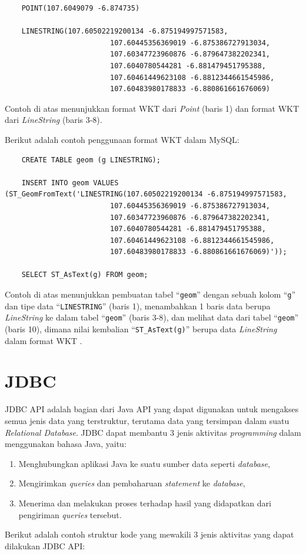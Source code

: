 \begin{lstlisting}
	POINT(107.6049079 -6.874735)
	
	LINESTRING(107.60502219200134 -6.875194997571583, 
						 107.60445356369019 -6.875386727913034,
						 107.60347723960876 -6.879647382202341,
						 107.6040780544281 -6.881479451795388,
						 107.60461449623108 -6.8812344661545986,
						 107.60483980178833 -6.880861661676069)
\end{lstlisting}

Contoh di atas menunjukkan format WKT dari \textit{Point} (baris 1) dan format WKT dari \textit{LineString} (baris 3-8).

Berikut adalah contoh penggunaan format WKT dalam MySQL:

\begin{lstlisting}
	CREATE TABLE geom (g LINESTRING);

	INSERT INTO geom VALUES (ST_GeomFromText('LINESTRING(107.60502219200134 -6.875194997571583, 
						 107.60445356369019 -6.875386727913034,
						 107.60347723960876 -6.879647382202341,
						 107.6040780544281 -6.881479451795388,
						 107.60461449623108 -6.8812344661545986,
						 107.60483980178833 -6.880861661676069)'));
	
	SELECT ST_AsText(g) FROM geom;
\end{lstlisting}

Contoh di atas menunjukkan pembuatan tabel ``\texttt{geom}'' dengan sebuah kolom ``\texttt{g}'' dan tipe data ``\texttt{LINESTRING}'' (baris 1), menambahkan 1 baris data berupa \textit{LineString} ke dalam tabel ``\texttt{geom}'' (baris 3-8), dan melihat data dari tabel ``\texttt{geom}'' (baris 10), dimana nilai kembalian ``\texttt{ST\_AsText(g)}'' berupa data \textit{LineString} dalam format WKT .



\section{JDBC}
\label{sec:jdbc}
JDBC API adalah bagian dari Java API yang dapat digunakan untuk mengakses semua jenis data yang terstruktur, terutama data yang tersimpan dalam suatu \textit{Relational Database}\cite{javadocumentation}. JDBC dapat membantu 3 jenis aktivitas \textit{programming} dalam menggunakan bahasa Java, yaitu:
\begin{enumerate}
	\item Menghubungkan aplikasi Java ke suatu sumber data seperti \textit{database},
	\item Mengirimkan \textit{queries} dan pembaharuan \textit{statement} ke \textit{database},
	\item Menerima dan melakukan proses terhadap hasil yang didapatkan dari pengiriman \textit{queries} tersebut.
\end{enumerate}
Berikut adalah contoh struktur kode yang mewakili 3 jenis aktivitas yang dapat dilakukan JDBC API:

